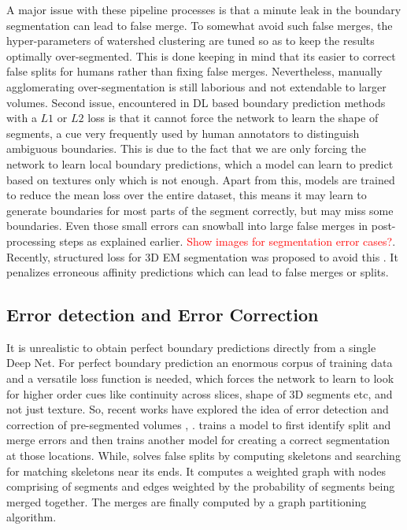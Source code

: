 A major issue with these pipeline processes is that a minute leak in the boundary segmentation can lead to false merge. To somewhat avoid such false merges, the hyper-parameters of watershed clustering are tuned so as to keep the results optimally over-segmented. This is done keeping in mind that its easier to correct false splits for humans rather than fixing false merges. Nevertheless, manually agglomerating over-segmentation is still laborious and not extendable to larger volumes.
Second issue, encountered in DL based boundary prediction methods with a $L1$ or $L2$ loss is that it cannot force the network to learn the shape of segments, a cue very frequently used by human annotators to distinguish ambiguous boundaries. This is due to the fact that we are only forcing the network to learn local boundary predictions, which a model can learn to predict based on textures only which is not enough.
Apart from this, models are trained to reduce the mean loss over the entire dataset, this means it may learn to generate boundaries for most parts of the segment correctly, but may miss some boundaries. Even those small errors can snowball into large false merges in post-processing steps as explained earlier. \textcolor{red}{Show images for segmentation error cases?}. Recently, structured loss for 3D EM segmentation was proposed to avoid this \cite{Funke2019}. It penalizes erroneous affinity predictions which can lead to false merges or splits. 

\subsection{Error detection and Error Correction}
It is unrealistic to obtain perfect boundary predictions directly from a single Deep Net. For perfect boundary prediction an enormous corpus of training data and a versatile loss function is needed, which forces the network to learn to look for higher order cues like continuity across slices, shape of 3D segments etc, and not just texture. So, recent works have explored the idea of error detection and correction of pre-segmented volumes \cite{Seung2017}, \cite{Brain2019}. \cite{Seung2017} trains a model to first identify split and merge errors and then trains another model for creating a correct segmentation at those locations. While, \cite{Brain2019} solves false splits by computing skeletons and searching for matching skeletons near its ends. It computes a weighted graph with nodes comprising of segments and edges weighted by the probability of segments being merged together. The merges are finally computed by a graph partitioning algorithm.

